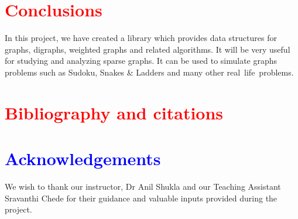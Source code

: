 \documentclass[11pt,a4paper]{article}
\begin{document}
\section*{\textcolor{red}{Conclusions}}
\color{black}
In this project, we have created a library which provides data structures for graphs, digraphs, weighted graphs and related algorithms. It will be very useful for studying and analyzing sparse graphs. It can be used to simulate  graphs problems such as Sudoku, Snakes \& Ladders and many other real life problems.

\section*{\textcolor{red}{Bibliography and citations}}
\section*{\textcolor{blue}{Acknowledgements}}
We wish to thank our instructor, Dr Anil Shukla and our Teaching Assistant Sravanthi Chede for their guidance and valuable inputs provided during the project.

\nocite{DiGraphs}
\nocite{wiki}
\nocite{algorithms}
\nocite{graphs}
\nocite{software}


\end{document}
